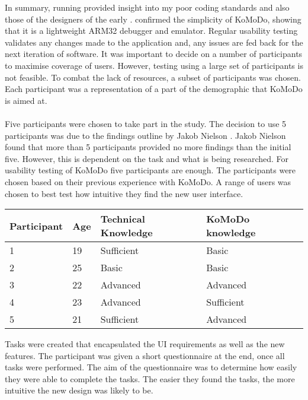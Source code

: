 In summary, running  provided insight into my poor coding standards and also those of the designers of the early .  confirmed the simplicity of KoMoDo, showing that it is a lightweight ARM32 debugger and emulator.
%
%
%
%
%
Regular usability testing validates any changes made to the application and, any issues are fed back for the next iteration of software. It was important to decide on a number of participants to maximise coverage of users. However, testing using a large set of participants is not feasible. To combat the lack of resources, a subset of participants was chosen. Each participant was a representation of a part of the demographic that KoMoDo is aimed at.\\\\
%
Five participants were chosen to take part in the study. The decision to use 5 participants was due to the findings outline by Jakob Nielson \cite{usability_engineer}. Jakob Nielson found that more than 5 participants provided no more findings than the initial five. However, this is dependent on the task and what is being researched. For usability testing of KoMoDo five participants are enough.
%
The participants were chosen based on their previous experience with KoMoDo. A range of users was chosen to best test how intuitive they find the new user interface.
\begin{center}
\begin{tabular}{| l |  p{1cm} | p{4cm} | p{4cm} | }
		\hline
		Participant & Age & Technical Knowledge & KoMoDo knowledge \\ \hline
		1 & 19 & Sufficient & Basic \\ \hline
		2 & 25 & Basic & Basic \\ \hline
		3 & 22 & Advanced & Advanced \\ \hline
		4 & 23 & Advanced & Sufficient \\ \hline
		5 & 21 & Sufficient & Advanced \\ \hline
\end{tabular}
\end{center}

Tasks were created that encapsulated the UI requirements as well as the new features. The participant was given a short questionnaire at the end, once all tasks were performed. The aim of the questionnaire was to determine how easily they were able to complete the tasks. The easier they found the tasks, the more intuitive the new design was likely to be.\\\\
